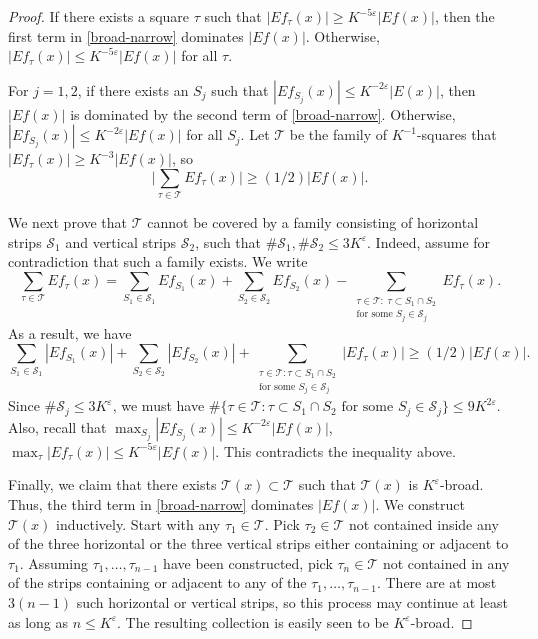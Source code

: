 \documentclass{amsart}%
\numberwithin{equation}{section}
\newcommand{\e}{\varepsilon}
\newcommand{\cs}{\mathcal S}
\newcommand{\cT}{{\mathcal T}}
\newcommand{\1}{\mathbbm{1}}
\begin{document}
\begin{proof}
	
	If there exists a square $\tau$ such that $|Ef_\tau(x)|\geq K^{-5\e}|Ef(x)|$, then the first term in \eqref{broad-narrow} dominates $|Ef(x)|$.
	Otherwise, $|Ef_\tau(x)|\leq K^{-5\e}|Ef(x)|$ for all $\tau$.
	
	For $j=1,2$, if there exists an $S_j$ such that $|Ef_{S_j}(x)|\leq K^{-2\e} |E(x)|$, then $|Ef(x)|$ is dominated by the second term of \eqref{broad-narrow}.
	Otherwise, $|Ef_{S_j}(x)|\leq K^{-2\e} |Ef(x)|$ for all $S_j$.
	Let $\cT$ be the family of $K^{-1}$-squares that $|Ef_\tau(x)|\geq K^{-3}|Ef(x)|$, so 
	\begin{equation}
		\nonumber
		\Big|\sum_{\tau\in\cT}Ef_\tau(x)\Big|\geq(1/2)|Ef(x)|.
	\end{equation}
	
	We next prove that $\cT$ cannot  be covered by a family consisting of horizontal strips $\cs_1$ and vertical strips $\cs_2$, such that $\#\cs_1, \#\cs_2\leq 3K^\e$. Indeed, assume for contradiction that such a family exists. We write
	\begin{equation}
		\nonumber
		\sum_{\tau\in\cT}Ef_\tau(x)=\sum_{S_1\in\cs_1}Ef_{S_1}(x)+\sum_{S_2\in\cs_2}Ef_{S_2}(x)-\sum_{\substack{\tau\in\cT:\;\tau\subset S_1\cap S_2\\ \text{for some $S_j\in\cs_j$}}}Ef_\tau(x).
	\end{equation}
	As a result, we have
	\begin{equation}
		\nonumber
		\sum_{S_1\in\cs_1}|Ef_{S_1}(x)|+\sum_{S_2\in\cs_2}|Ef_{S_2}(x)|+\sum_{\substack{\tau\in\cT:\tau\subset S_1\cap S_2\\ \text{for some $S_j\in\cs_j$}}}|Ef_\tau(x)|\geq(1/2)|Ef(x)|.
	\end{equation}
	Since $\#\cs_j\leq 3K^\e$, we must have $\#\{\tau\in\cT:\tau\subset S_1\cap S_2 \text{ for some $S_j\in\cs_j$}\}\le 9K^{2\e}$.
	Also, recall that $\max_{S_j}|Ef_{S_j}(x)|\leq K^{-2\e}|Ef(x)|$, $\max_{\tau}|Ef_{\tau}(x)|\leq K^{-5\e}|Ef(x)|$.
	This contradicts the inequality above. 
	
	
	Finally, we claim that there exists $\cT(x)\subset\cT$ such that $\cT(x)$ is $K^\e$-broad. Thus, the third term in \eqref{broad-narrow} dominates $|Ef(x)|$.
	We construct $\cT(x)$ inductively. Start with any $\tau_1\in\cT$. Pick $\tau_2\in\cT$ not contained inside any of the three horizontal or the three vertical strips either containing or adjacent to $\tau_1$. Assuming $\tau_1,\ldots,\tau_{n-1}$ have been constructed, pick $\tau_n\in \cT$ not contained in any of the strips containing or adjacent to any of the $\tau_1,\ldots,\tau_{n-1}$. There are at most $3(n-1)$ such horizontal or vertical strips, so this process may continue at least as long as $n\le K^{\e}$. The resulting collection is easily seen to be $K^\e$-broad.
	\qedhere
	
	
	
\end{proof}
\end{document}
